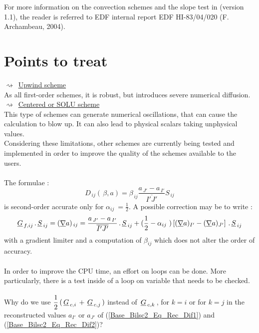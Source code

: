 \noindent{}
For more information on the convection schemes and the slope test in \CS
(version 1.1), the reader is referred to EDF internal report EDF HI-83/04/020 (F. Archambeau,
2004).

\newpage
\section*{Points to treat}
\hspace*{1cm}$\rightsquigarrow$\  \underline {Upwind scheme}\\
As all first-order schemes, it is robust, but introduces severe numerical diffusion. \\
\hspace*{1cm}$\rightsquigarrow$\ \underline {Centered or SOLU scheme}\\
This type of schemes can generate numerical oscillations, that can cause the calculation
to blow up. It can also lead to physical scalars taking unphysical values.\\
Considering these limitations, other schemes are currently being tested and implemented
in order to improve the quality of the schemes  available to the users.\\\\
The formulae :
\begin{equation}
D_{\,ij}(\,\beta, a) = \beta_{\,ij} \frac{a_{\,J'}- a_{\,I'}}{\overline{I'J'}} S_{\,ij}
\end{equation}
is second-order accurate only for $\alpha_{ij}\ = \displaystyle\frac{1}{2}$.
A possible correction may be to write :\\
\begin{equation}
\underline{G}_{\,f,ij}\,.\,\underline{S}_{\,ij} = (\underline{\nabla} a)_{\,ij} = \frac{a_{\,J'}- a_{\,I'}}{\overline{I'J'}}\,.\,\underline{S}_{\,ij} + (\displaystyle\frac{1}{2} -
\alpha_{ij}\ )\left[(\underline{\nabla} a)_{I'} - (\underline{\nabla} a)_{J'}\right]\,.\,\underline{S}_{\,ij}
\end{equation}
with a gradient limiter and a computation of $\beta_{ij}$ which does not
alter the order of accuracy.\\\\
In order to improve the CPU time, an effort on loops can be done.
More particularly, there is a test  inside of a loop on variable  that needs
to be checked.\\\\
Why do we use $\displaystyle\frac{1}{2}\,(\,\underline{G}_{\,c,i}\,+\,\underline{G}_{\,c,j}\,)$ instead of $\,\underline{G}_{\,c,k}\,$, for $k=i$ or for $k=j$ in the reconstructed values  $a_{I'}$ or $a_{J'}$ of (\ref{Base_Bilsc2_Eq_Rec_Dif1}) and (\ref{Base_Bilsc2_Eq_Rec_Dif2})?
